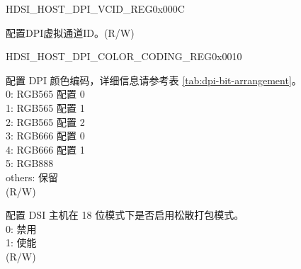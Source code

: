     
    \begin{register}{H}{DSI\_HOST\_DPI\_VCID\_REG}{0x000C}\label{regdesc:DSIHOSTDPIVCIDREG}
    \regnewline%
    \begin{regdesc}\begin{reglist}
    \label{fielddesc:DSIHOSTDPIVCID}\item [DSI\_HOST\_DPI\_VCID] 配置DPI虚拟通道ID。(R/W)
    \end{reglist}\end{regdesc}
    \end{register}
    
    
    \begin{register}{H}{DSI\_HOST\_DPI\_COLOR\_CODING\_REG}{0x0010}\label{regdesc:DSIHOSTDPICOLORCODINGREG}
    \regnewline%
    \begin{regdesc}\begin{reglist}
    \label{fielddesc:DSIHOSTDPICOLORCODING}\item [DSI\_HOST\_DPI\_COLOR\_CODING] 配置 DPI 颜色编码，详细信息请参考表 \ref{tab:dpi-bit-arrangement}。\\
    0: RGB565 配置 0\\
    1: RGB565 配置 1\\
    2: RGB565 配置 2\\
    3: RGB666 配置 0\\
    4: RGB666 配置 1\\
    5: RGB888\\
    others: 保留\\
    (R/W)

    \label{fielddesc:DSIHOSTLOOSELY18EN}\item [DSI\_HOST\_LOOSELY18\_EN] 配置 DSI 主机在 18 位模式下是否启用松散打包模式。\\0: 禁用\\1: 使能 \\(R/W)
    \end{reglist}\end{regdesc}
    \end{register}
    
